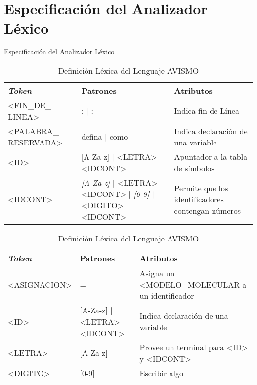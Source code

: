 \documentclass[14pt, aspectratio=169]{beamer}
\begin{document}
\section{Especificación del Analizador Léxico}

\begin{frame}{Especificación del Analizador Léxico}
     {
        \begin{table}[ht]
            \footnotesize
            \begin{tabularx}{\linewidth}{|X|X|X|}
                \hline
                \textit{Token}        & Patrones                                                                  & Atributos                                         \\\hline
                <FIN\_DE\_ LINEA>     & ; | :                                                                     & Indica fin de Línea                               \\\hline
                <PALABRA\_ RESERVADA> & defina | como                                                             & Indica declaración de una variable                \\\hline
                <ID>                  & [A-Za-z] | <LETRA> <IDCONT>                                               & Apuntador a la tabla de símbolos                  \\\hline
                <IDCONT>              & \textit{[A-Za-z]} | <LETRA> <IDCONT> | \textit{[0-9]} | <DIGITO> <IDCONT> & Permite que los identificadores contengan números \\\hline
            \end{tabularx}
            \label{table: lexTable1}
            \caption{Definición Léxica del Lenguaje AVISMO}
        \end{table}
    }
     {
        \begin{table}[ht]
            \footnotesize
            \begin{tabularx}{\linewidth}{|X|X|X|}
                \hline
                \textit{Token} & Patrones                    & Atributos                                       \\\hline
                <ASIGNACION>   & =                           & Asigna un <MODELO\_MOLECULAR a un identificador \\\hline
                <ID>           & [A-Za-z] | <LETRA> <IDCONT> & Indica declaración de una variable              \\\hline
                <LETRA>        & [A-Za-z]                    & Provee un terminal para <ID> y <IDCONT>         \\\hline
                <DIGITO>       & [0-9]                       & Escribir algo                                   \\\hline
            \end{tabularx}
            \label{table: lexTable2}
            \caption{Definición Léxica del Lenguaje AVISMO}
        \end{table}
    }
\end{frame}
\end{document}
